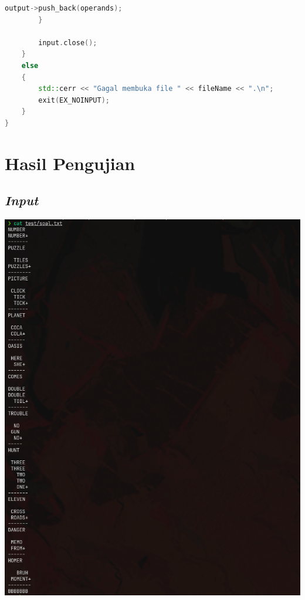 \documentclass{article}
\let\origfigure\figure
\let\endorigfigure\endfigure
\renewenvironment{figure}[1][2] {
    \expandafter\origfigure\expandafter[H]
} {
    \endorigfigure
}
\begin{document}
\begin{lstlisting}[caption = main.cpp, language = c++]
            output->push_back(operands);
        }

        input.close();
    }
    else
    {
        std::cerr << "Gagal membuka file " << fileName << ".\n";
        exit(EX_NOINPUT);
    }
}
\end{lstlisting}

\section{Hasil Pengujian}

\subsection{\textit{Input}}
\begin{figure}
  \includegraphics{stima-ss-3.png}
  \caption{Masukan program (11 soal)}
\end{figure}
\end{document}

